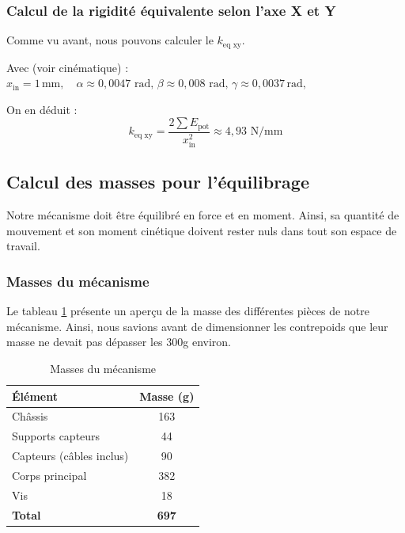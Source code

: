 \documentclass[a4paper, 11pt]{article} %
\begin{document}
\subsubsection*{Calcul de la rigidité équivalente selon l'axe X et Y}

Comme vu avant, nous pouvons calculer le $k_{\text{eq xy}}$. 

Avec (voir cinématique) :
$ x_{\text{in}} = 1\, \text{mm},\quad \alpha \approx 0,0047\text{ rad, }
\beta \approx 0,008
\text{ rad, } \gamma \approx 0,0037\, \text{rad},$


On en déduit :
$$
k_{\text{eq xy}} = \frac{2 \sum E_{\text{pot}}}{x_{\text{in}}^2} \approx 4,93\text{ N/mm}
$$

\subsection{Calcul des masses pour l'équilibrage}\label{sub:labelito}
Notre mécanisme doit être équilibré en force et en moment. Ainsi, sa quantité de mouvement et son moment cinétique doivent rester nuls dans tout son espace de travail.

\vspace{1em}

\noindent
\begin{minipage}[t]{0.50\textwidth}

\subsubsection*{Masses du mécanisme}
Le tableau \ref{tab:masse} présente un aperçu de la masse des différentes pièces de notre mécanisme. Ainsi, nous savions avant de dimensionner les contrepoids que leur masse ne devait pas dépasser les 300g environ.

\end{minipage}
\hfill
\begin{minipage}[t]{0.45\textwidth}
\vspace*{-2.5 em} %
\begin{table}[H]
\centering
\begin{tabular}{|l|c|}
\hline
\textbf{Élément} & \textbf{Masse (g)} \\
\hline
Châssis & 163 \\
Supports capteurs & 44 \\
Capteurs (câbles inclus) & 90 \\
Corps principal & 382 \\
Vis & 18 \\
\hline
\textbf{Total} & \textbf{697} \\
\hline
\end{tabular}
\caption{Masses du mécanisme}
\label{tab:masse}
\end{table}
\end{minipage}
\end{document}
